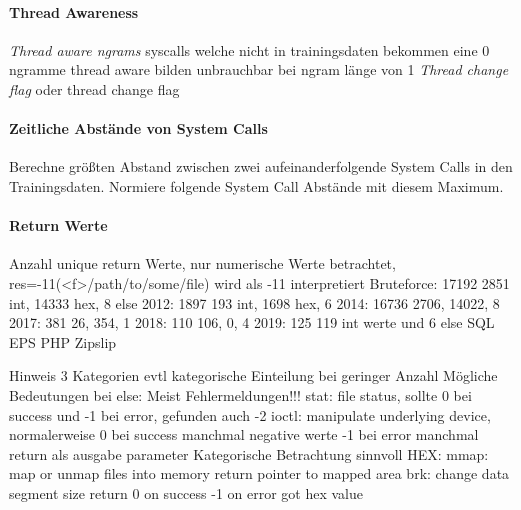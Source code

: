             \paragraph{Thread Awareness}
                \textit{Thread aware ngrams}
                    syscalls welche nicht in trainingsdaten bekommen eine 0
                    ngramme thread aware bilden unbrauchbar bei ngram länge von 1
                \textit{Thread change flag}
                    oder thread change flag

            \paragraph{Zeitliche Abstände von System Calls}
                Berechne größten Abstand zwischen zwei aufeinanderfolgende System Calls in den Trainingsdaten.
                Normiere folgende System Call Abstände mit diesem Maximum.

            \paragraph{Return Werte}
                Anzahl unique return Werte, nur numerische Werte betrachtet, 
                res=-11(<f>/path/to/some/file) wird als -11 interpretiert
                Bruteforce: 17192 2851 int, 14333 hex, 8 else
                2012:       1897 193 int, 1698 hex, 6
                2014:       16736 2706, 14022, 8
                2017:       381 26, 354, 1 
                2018:       110 106, 0, 4 
                2019:       125 119 int werte und 6 else
                SQL
                EPS
                PHP
                Zipslip

                Hinweis 3 Kategorien evtl kategorische Einteilung bei geringer Anzahl
                Mögliche Bedeutungen bei else:
                    Meist Fehlermeldungen!!!
                    stat:
                        file status, 
                        sollte 0 bei success und -1 bei error, gefunden auch -2 
                    ioctl:
                        manipulate underlying device, 
                        normalerweise 0 bei success manchmal negative werte
                        -1 bei error
                        manchmal return als ausgabe parameter
                    Kategorische Betrachtung sinnvoll
                HEX:\@
                    mmap:
                        map or unmap files into memory
                        return pointer to mapped area
                    brk:
                        change data segment size
                        return 0 on success -1 on error
                        got hex value

